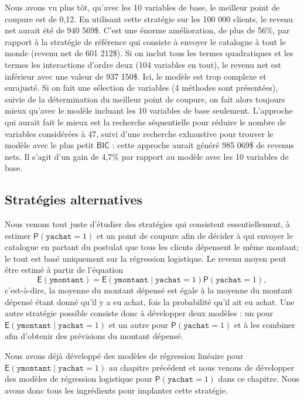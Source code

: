 \documentclass[
  11pt,
  letterpaper,
]{book}
\theoremstyle{definition}
\theoremstyle{definition}
\theoremstyle{definition}
\theoremstyle{remark}
\begin{document}
Nous avons vu plus tôt, qu'avec les 10 variables de base, le meilleur point de coupure est de 0,12. En utilisant cette stratégie sur les 100 000 clients, le revenu net aurait été de 940 569\$. C'est une énorme amélioration, de plus de 56\%, par rapport à la stratégie de référence qui consiste à envoyer le catalogue à tout le monde (revenu net de 601 212\$). Si on inclut tous les termes quadratiques et les termes les interactions d'ordre deux (104 variables en tout), le revenu net est inférieur avec une valeur de 937 150\$. Ici, le modèle est trop complexe et surajusté. Si on fait une sélection de variables (4 méthodes sont présentées), suivie de la détermination du meilleur point de coupure, on fait alors toujours mieux qu'avec le modèle incluant les 10 variables de base seulement. L'approche qui aurait fait le mieux est la recherche séquentielle pour réduire le nombre de variables considérées à 47, suivi d'une recherche exhaustive pour trouver le modèle avec le plus petit \(\mathsf{BIC}\) : cette approche aurait généré 985 069\$ de revenus nets. Il s'agit d'un gain de 4,7\% par rapport au modèle avec les 10 variables de base.

\hypertarget{stratuxe9gies-alternatives}{%
\subsection{Stratégies alternatives}\label{stratuxe9gies-alternatives}}

Nous venons tout juste d'étudier des stratégies qui consistent essentiellement, à estimer \({\mathsf P}\left(\texttt{yachat}=1\right)\) et un point de coupure afin de décider à qui envoyer le catalogue en partant du postulat que tous les clients dépensent le même montant; le tout est basé uniquement sur la régression logistique. Le revenu moyen peut être estimé à partir de l'équation
\[{\mathsf E}\left(\texttt{ymontant}\right) = {\mathsf E}\left(\texttt{ymontant} \mid \texttt{yachat}=1\right) {\mathsf P}\left(\texttt{yachat
}=1\right),
\]
c'est-à-dire, la moyenne du montant dépensé est égale à la moyenne du montant dépensé étant donné qu'il y a eu achat, fois la probabilité qu'il ait eu achat. Une autre stratégie possible consiste donc à développer deux modèles : un pour \({\mathsf E}\left(\texttt{ymontant} \mid \texttt{yachat}=1\right)\) et un autre pour \({\mathsf P}\left(\texttt{yachat}=1\right)\) et à les combiner afin d'obtenir des prévisions du montant dépensé.

Nous avons déjà développé des modèles de régression linéaire pour \({\mathsf E}\left(\texttt{ymontant} \mid \texttt{yachat}=1\right)\) au chapitre précédent et nous venons de développer des modèles de régression logistique pour \({\mathsf P}\left(\texttt{yachat}=1\right)\) dans ce chapitre. Nous avons donc tous les ingrédients pour implanter cette stratégie.
\end{document}
